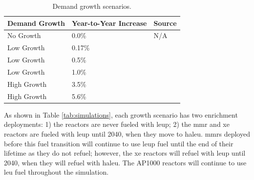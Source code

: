\begin{table}[H]
    \centering
    \caption{Demand growth scenarios.}
    \label{tab:demand_scenarios}
    \begin{tabular}{l l l}
        \hline
        \textbf{Demand Growth} & \textbf{Year-to-Year Increase} & \textbf{Source}\\
        \hline
        No Growth & 0.0\% & N/A\\
        Low Growth & 0.17\% & \cite{eia_aeo_2023}\\
        Low Growth & 0.5\% & \cite{eia_aeo_2023}\\
        Low Growth & 1.0\% & \cite{eia_aeo_2023}\\
        High Growth & 3.5\% & \cite{julie_liftoff_pathways_2024} \\
        High Growth & 5.6\% & \cite{julie_liftoff_pathways_2024}\\
        \hline
    \end{tabular}
  \end{table}

As shown in Table \ref{tab:simulations}, each growth scenario has two enrichment deployments: 1) the reactors are never fueled with \gls{leup}; 2) the \gls{mmr} and \gls{xe} reactors are fueled with \gls{leup} until 2040, when they move to \gls{haleu}. \glspl{mmr} deployed before this fuel transition will continue to use \gls{leup} fuel until the end of their lifetime as they do not refuel; however, the \gls{xe} reactors will refuel with \gls{leup} until 2040, when they will refuel with \gls{haleu}. The AP1000 reactors will continue to use \gls{leu} fuel throughout the simulation.

